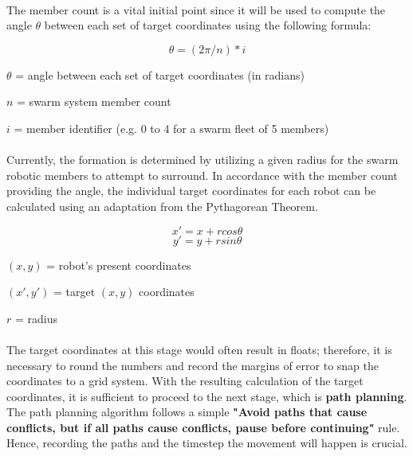 \paragraph*{}
The member count is a vital initial point since it will be used to compute the angle \(\theta\) between each set of target coordinates using the following formula:

\[\theta = (2\pi / n) * i\]

\begin{description}
    \item[where:]
    \item \(\theta\) = angle between each set of target coordinates (in radians)
    \item \(n\) = swarm system member count
    \item \(i\) = member identifier (e.g. 0 to 4 for a swarm fleet of 5 members)
\end{description}

\paragraph*{}
Currently, the formation is determined by utilizing a given radius for the swarm robotic members to attempt to surround. In accordance with the member count providing the angle, the individual target coordinates for each robot can be calculated using an adaptation from the Pythagorean Theorem. 

\[x' = x + rcos\theta\]
\[y' = y + rsin\theta\]

\begin{description}
    \item 
    \item[where:]
    \item \((x, y)\) = robot's present coordinates
    \item \((x', y')\) = target \((x, y)\) coordinates
    \item \(r\) = radius
\end{description}

\paragraph*{}
The target coordinates at this stage would often result in floats; therefore, it is necessary to round the numbers and record the margins of error to snap the coordinates to a grid system. With the resulting calculation of the target coordinates, it is sufficient to proceed to the next stage, which is \textbf{path planning}. The path planning algorithm follows a simple \textbf{"Avoid paths that cause conflicts, but if all paths cause conflicts, pause before continuing"} rule. Hence, recording the paths and the timestep the movement will happen is crucial.

